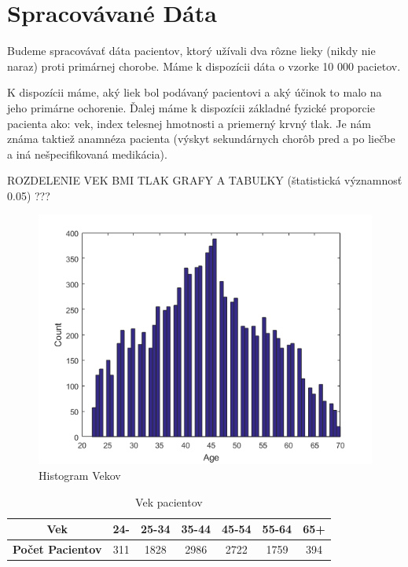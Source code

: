 \section{Spracovávané Dáta}

Budeme spracovávať dáta pacientov, ktorý užívali dva rôzne lieky (nikdy nie naraz) proti primárnej chorobe. Máme k dispozícii dáta o vzorke 10 000 pacietov.


K dispozícii máme, aký liek bol podávaný pacientovi a aký účinok to malo na jeho primárne ochorenie. Ďalej máme k dispozícii základné fyzické proporcie pacienta ako: vek, index telesnej hmotnosti a priemerný krvný tlak. Je nám známa taktiež anamnéza pacienta (výskyt sekundárnych chorôb pred a po liečbe a iná nešpecifikovaná medikácia).

ROZDELENIE VEK BMI TLAK GRAFY A TABUĽKY (štatistická významnosť 0.05) ???


\begin{figure}[h!]
	\centering
  		\includegraphics[width=1.0\textwidth]{ages.png}
  	\caption{Histogram Vekov}
\end{figure}




\begin{table}[h!]
\centering
\label{vek}
\begin{tabular}{c|cccccc}
\hline
\textbf{Vek}             & 24- & 25-34 & 35-44 & 45-54 & 55-64 & 65+ \\ \hline
\textbf{Počet Pacientov} & 311 & 1828  & 2986  & 2722  & 1759  & 394 \\ \hline
\end{tabular}
\caption{Vek pacientov}
\end{table}